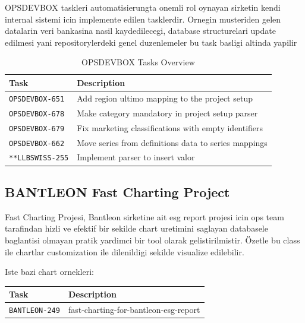 OPSDEVBOX taskleri automatisierungta onemli rol oynayan sirketin kendi internal sistemi icin implemente edilen tasklerdir.
Ornegin musteriden gelen datalarin veri bankasina nasil kaydedilecegi, database structurelari update edilmesi yani repositorylerdeki genel duzenlemeler bu task basligi altinda yapilir 


\begin{table}[H]
\centering
\begin{tabular}{p{4cm} p{10cm}}
\toprule
\textbf{Task} & \textbf{Description} \\
\midrule

\texttt{OPSDEVBOX-651} & Add region ultimo mapping to the project setup \\
\texttt{OPSDEVBOX-678} & Make category mandatory in project setup parser \\
\texttt{OPSDEVBOX-679} & Fix marketing classifications with empty identifiers \\
\texttt{OPSDEVBOX-662} & Move series from definitions data to series mappings \\
\texttt{**LLBSWISS-255} & Implement parser to insert valor \\

\bottomrule
\end{tabular}
\caption{OPSDEVBOX Tasks Overview}
\label{tab:opsdevbox-tasks}
\end{table}




\subsection*{BANTLEON Fast Charting Project}

Fast Charting Projesi, Bantleon sirketine ait esg report projesi icin ops team tarafindan hizli ve efektif bir sekilde chart uretimini saglayan databasele baglantisi olmayan pratik yardimci bir tool olarak gelistirilmistir.
Özetle bu class ile chartlar customization ile dilenildigi sekilde visualize edilebilir.

Iste bazi chart ornekleri:

\begin{figure}
    
\end{figure}

\begin{table}[H]
\centering
\begin{tabular}{p{4cm} p{10cm}}
\toprule
\textbf{Task} & \textbf{Description} \\
\midrule
\texttt{BANTLEON-249} & fast-charting-for-bantleon-esg-report \\
\bottomrule
\end{tabular}
\end{table}

